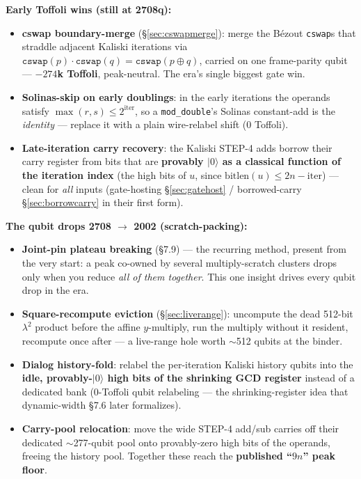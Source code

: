 \documentclass[11pt,a4paper]{article}
\newcommand{\ket}[1]{$|#1\rangle$\xspace}
\begin{document}
\smallskip\noindent\textbf{Early Toffoli wins (still at 2708q):}
\begin{itemize}
  \item \textbf{cswap boundary-merge} (\S\ref{sec:cswapmerge}): merge the B\'ezout \texttt{cswap}s that
    straddle adjacent Kaliski iterations via $\texttt{cswap}(p)\cdot\texttt{cswap}(q)=\texttt{cswap}(p
    \oplus q)$, carried on one frame-parity qubit --- \textbf{$-274$k Toffoli}, peak-neutral. The era's
    single biggest gate win.
  \item \textbf{Solinas-skip on early doublings}: in the early iterations the operands satisfy
    $\max(r,s) \le 2^{\text{iter}}$, so a \texttt{mod\_double}'s Solinas constant-add is the
    \emph{identity} --- replace it with a plain wire-relabel shift (0 Toffoli).
  \item \textbf{Late-iteration carry recovery}: the Kaliski STEP-4 adds borrow their carry register
    from bits that are \textbf{provably \ket{0} as a classical function of the iteration index} (the
    high bits of $u$, since $\mathrm{bitlen}(u) \le 2n-\text{iter}$) --- clean for \emph{all} inputs
    (gate-hosting \S\ref{sec:gatehost} / borrowed-carry \S\ref{sec:borrowcarry} in their first form).
\end{itemize}

\smallskip\noindent\textbf{The qubit drops 2708 $\to$ 2002 (scratch-packing):}
\begin{itemize}
  \item \textbf{Joint-pin plateau breaking} (\S7.9) --- the recurring method, present from the very
    start: a peak co-owned by several multiply-scratch clusters drops only when you reduce \emph{all of
    them together}. This one insight drives every qubit drop in the era.
  \item \textbf{Square-recompute eviction} (\S\ref{sec:liverange}): uncompute the dead 512-bit
    $\lambda^2$ product before the affine $y$-multiply, run the multiply without it resident, recompute
    once after --- a live-range hole worth $\sim$512 qubits at the binder.
  \item \textbf{Dialog history-fold}: relabel the per-iteration Kaliski history qubits into the
    \textbf{idle, provably-\ket{0} high bits of the shrinking GCD register} instead of a dedicated bank
    (0-Toffoli qubit relabeling --- the shrinking-register idea that dynamic-width \S7.6 later
    formalizes).
  \item \textbf{Carry-pool relocation}: move the wide STEP-4 add/sub carries off their dedicated
    $\sim$277-qubit pool onto provably-zero high bits of the operands, freeing the history pool.
    Together these reach the \textbf{published ``$9n$'' peak floor}.
\end{itemize}
\end{document}
